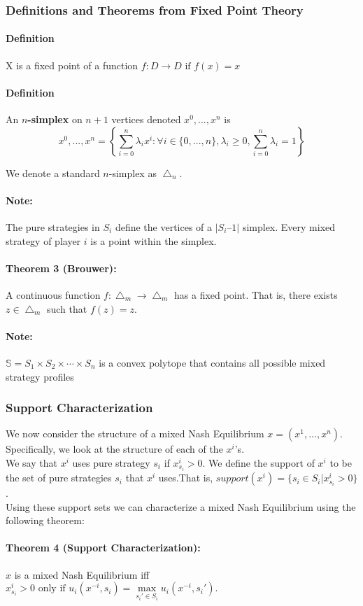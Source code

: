\documentclass[12pt]{article}
\newcommand{\Note}{\paragraph{Note:}}
\newcommand{\Definition}{\paragraph{Definition}}
\begin{document}
\subsubsection{Definitions and Theorems from Fixed Point Theory}

\Definition X is a fixed point of a function $f: D \rightarrow D \text{ if } f(x) = x$

\Definition An \textbf{$n$-simplex}\cite{29} on $n+1$ vertices denoted $x^0,...,x^n$ is 
\begin{equation*}
x^0,...,x^n = \left \{ \sum\limits_{i=0}^n \lambda_i x^i : \forall i \in \{0,...,n\}, \lambda_i \geq 0, \sum\limits_{i = 0}^n \lambda_i = 1 \right \}
\end{equation*}

We denote a standard $n$-simplex as $\bigtriangleup_n$.

\Note The pure strategies in $S_i$ define the vertices of a $|S_i – 1|$ simplex. Every mixed strategy of player $i$ is a point within the simplex. 

\paragraph{Theorem 3 (Brouwer):} A continuous function $f: \bigtriangleup_m \rightarrow \bigtriangleup_m$ has a fixed point. That is, there exists $z \in \bigtriangleup_m$ such that $f(z) = z$.

\Note $\mathbb{S} = S_1 \times S_2 \times \cdots \times S_n$ is a convex polytope that contains all possible mixed strategy profiles \cite{26}

\subsubsection{Support Characterization}

We now consider the structure of a mixed Nash Equilibrium $x = (x^1,..., x^n)$. Specifically, we look at the structure of each of the $x^i$’s.\\

We say that $x^i$ uses pure strategy $s_i$ if $x^i_{s_i} > 0$. We define the support of $x^i$ to be the set of pure strategies $s_i$ that $x^i$ uses.That is, $support(x^i) = \{s_i \in S_i | x^i_{s_i} > 0\}$.\\
 
Using these support sets we can characterize a mixed Nash Equilibrium using the following theorem:

\paragraph{Theorem 4 (Support Characterization):}$x$ is a mixed Nash Equilibrium iff $x^i_{s_i} > 0 \text{ only if } u_i(x^{-i}, s_i) = \max\limits_{ s_i' \in S_i} u_i(x^{-i}, s_i').$
\end{document}

